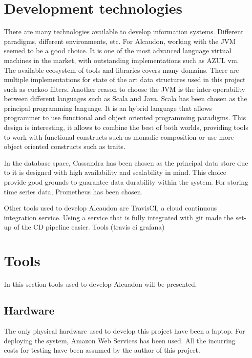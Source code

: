 \section{Development technologies}

There are many technologies available to develop information systems. Different
paradigms, different environments, etc. For Alcaudon, working with the JVM seemed
to be a good choice. It is one of the most advanced language virtual machines in
the market, with outstanding implementations such as AZUL vm. The available
ecosystem of tools and libraries covers many domains. There are multiple
implementations for state of the art data structures used in this project such
as cuckoo filters\cite{cuckoo}. Another reason to choose the JVM is the
inter-operability between different languages such as Scala and Java.
Scala has been chosen as the principal programming language. It is an hybrid
language that allows programmer to use functional and object oriented programming
paradigms. This design is interesting, it allows to combine the best of both worlds,
providing tools to work with functional constructs such as monadic composition or use
more object oriented constructs such as traits.

In the database space, Cassandra has been chosen as the principal data store due
to it is designed with high availability and scalability in mind. This choice
provide good grounds to guarantee data durability within the system. For storing
time series data, Prometheus has been chosen. 

Other tools used to develop Alcaudon are TravisCI, a cloud continuous
integration service. Using a service that is fully integrated with git
made the set-up of the CD pipeline easier. 
Tools (travis ci grafana)

\section{Tools}

In this section tools used to develop Alcuadon will be presented. 

\subsection{Hardware}

The only physical hardware used to develop this project have been a laptop. For
deploying the system, Amazon Web Services has been used. All the incurring costs
for testing have been assumed by the author of this project.

